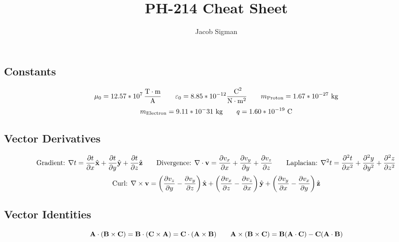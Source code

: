 \documentclass{article}
\title{PH-214 Cheat Sheet}
\author{Jacob Sigman}
\date{}
\begin{document}
\maketitle

\subsection*{Constants}
\[\mu_0=12.57*10^7\,\frac{\textnormal{T}\cdot\textnormal{m}}{\textnormal{A}}\hspace{7 mm}\varepsilon_0=8.85*10^{-12}\frac{\textnormal{ C}^2}{\textnormal{N}\cdot\textnormal{m}^2}\hspace{7 mm}m_{\textnormal{Proton}}=1.67*10^{-27}\textnormal{ kg}\]
\[m_{\textnormal{Electron}}=9.11*10^-31\textnormal{ kg}\hspace{7 mm}q=1.60*10^{-19} \textnormal{ C}\]
\subsection*{Vector Derivatives}
\[\textnormal{Gradient: }\nabla t = \frac{\partial t}{\partial x}\hat{\textbf{x}}+\frac{\partial t}{\partial y}\hat{\textbf{y}}+\frac{\partial t}{\partial z}\hat{\textbf{z}}\hspace{7 mm}\textnormal{Divergence: }\nabla\cdot \textbf{v}=\frac{\partial v_x}{\partial x}+\frac{\partial v_y}{\partial y}+\frac{\partial v_z}{\partial z}\hspace{7 mm}\textnormal{Laplacian: }\nabla^2t=\frac{\partial^2t}{\partial x^2}+\frac{\partial^2y}{\partial y^2}+\frac{\partial^2z}{\partial z^2}\]
\[\textnormal{Curl: }\nabla\times \textbf{v} = \left(\frac{\partial v_z}{\partial y}-\frac{\partial v_y}{\partial z}\right)\hat{\textbf{x}}+\left(\frac{\partial v_x}{\partial z}-\frac{\partial v_z}{\partial x}\right)\hat{\textbf{y}}+\left(\frac{\partial v_y}{\partial x}-\frac{\partial v_x}{\partial y}\right)\hat{\textbf{z}}\]
\subsection*{Vector Identities}
\[\textbf{A}\cdot(\textbf{B}\times\textbf{C})=\textbf{B}\cdot(\textbf{C}\times\textbf{A})=\textbf{C}\cdot(\textbf{A}\times\textbf{B})\hspace{7 mm}\textbf{A}\times(\textbf{B}\times\textbf{C})=\textbf{B}(\textbf{A}\cdot\textbf{C})-\textbf{C}(\textbf{A}\cdot\textbf{B})\]
\end{document}
